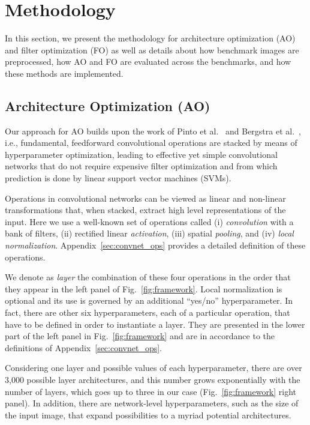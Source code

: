 \section{Methodology}
\label{sec:methodology}

In this section, we present the methodology for architecture optimization (AO) and filter optimization (FO) as well as details about how benchmark images are preprocessed, how AO and FO are evaluated across the benchmarks, and how these methods are implemented.

\subsection{Architecture Optimization (AO)}
\label{sec:ao}

Our approach for AO builds upon the work of Pinto et al.~\cite{Pinto:2009} and Bergstra et al.~\cite{Bergstra:2013}, i.e., fundamental, feedforward convolutional operations are stacked by means of hyperparameter optimization, leading to effective yet simple convolutional networks that do not require expensive filter optimization and from which prediction is done by linear support vector machines (SVMs).

Operations in convolutional networks can be viewed as linear and non-linear transformations that, when stacked, extract high level representations of the input. Here we use a well-known set of operations called (i) \emph{convolution} with a bank of filters, (ii) rectified linear \emph{activation}, (iii) spatial \emph{pooling}, and (iv) \emph{local normalization}. Appendix~\ref{sec:convnet_ops} provides a detailed definition of these operations.

We denote as \emph{layer} the combination of these four operations in the order that they appear in the left panel of Fig.~\ref{fig:framework}. Local normalization is optional and its use is governed by an additional ``yes/no'' hyperparameter. In fact, there are other six hyperparameters, each of a particular operation, that have to be defined in order to instantiate a layer. They are presented in the lower part of the left panel in Fig.~\ref{fig:framework} and are in accordance to the definitions of Appendix~\ref{sec:convnet_ops}.

Considering one layer and possible values of each hyperparameter, there are over 3,000 possible layer architectures, and this number grows exponentially with the number of layers, which goes up to three in our case (Fig.~\ref{fig:framework} right panel). In addition, there are network-level hyperparameters, such as the size of the input image, that expand possibilities to a myriad potential architectures.
 
